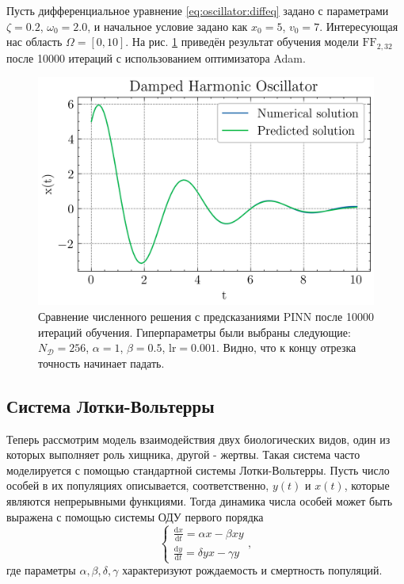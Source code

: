 \documentclass[a4paper, 12pt]{article}
\begin{document}
Пусть дифференциальное уравнение \ref{eq:oscillator:diffeq} задано с параметрами $\zeta = 0.2$, $\omega_0 = 2.0$, и начальное условие задано как $x_0 = 5$, $v_0 = 7$. Интересующая нас область $\Omega = [0, 10]$. На рис. \ref{fig:oscillator:solution} приведён результат обучения модели $\mathrm{FF}_{2, 32}$ после 10000 итераций с использованием оптимизатора Adam.

\begin{figure}
    \centering
    \includegraphics{../images/oscillator/Damped Harmonic Oscillator.png}
    \caption{Сравнение численного решения с предсказаниями PINN после 10000 итераций обучения. Гиперпараметры были выбраны следующие: $N_\mathcal{D} = 256$, $\alpha = 1$, $\beta = 0.5$, $\mathrm{lr} = 0.001$. Видно, что к концу отрезка точность начинает падать.}
    \label{fig:oscillator:solution}
\end{figure}

\subsection{Система Лотки-Вольтерры}

Теперь рассмотрим модель взаимодействия двух биологических видов, один из которых выполняет роль хищника, другой - жертвы. Такая система часто моделируется с помощью стандартной системы Лотки-Вольтерры. Пусть число особей в их популяциях описывается, соответственно, $y(t)$ и $x(t)$, которые являются непрерывными функциями. Тогда динамика числа особей может быть выражена с помощью системы ОДУ первого порядка
\begin{equation} \label{eq:lotkavolterra:diffeq}
\begin{cases}
    \frac{\mathrm{d}x}{\mathrm{d}t} = \alpha x - \beta x y \\
    \frac{\mathrm{d}y}{\mathrm{d}t} = \delta y x - \gamma y
\end{cases},
\end{equation}
где параметры $\alpha, \beta, \delta, \gamma$ характеризуют рождаемость и смертность популяций.
\end{document}

